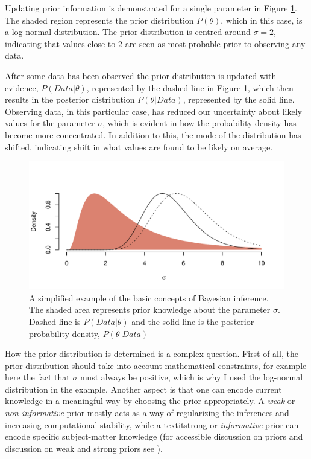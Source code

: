 \documentclass{article}\usepackage{knitr}
\begin{document}
Updating prior information is demonstrated for a single parameter in Figure \ref{fig:priorpost}. The shaded region represents the prior distribution $P(\theta)$, which in this case, is a log-normal distribution. The prior distribution is centred around $\sigma = 2$, indicating that values close to $2$ are seen as most probable prior to observing any data. 

After some data has been observed the prior distribution is updated with evidence, $P(Data | \theta)$, represented by the dashed line in Figure \ref{fig:priorpost}, which then results in the posterior distribution $P(\theta | Data)$, represented by the solid line. Observing data, in this particular case, has reduced our uncertainty about likely values for the parameter $\sigma$, which is evident in how the probability density has become more concentrated. In addition to this, the mode of the distribution has shifted, indicating shift in what values are found to be likely on average.

\begin{figure}
\centering
\begin{knitrout}
\color{fgcolor}
\includegraphics[width=\maxwidth]{figure/unnamed-chunk-13-1} 
\end{knitrout}
\caption{A simplified example of the basic concepts of Bayesian inference. The shaded area represents prior knowledge about the parameter $\sigma$. Dashed line is $P(Data | \theta)$ and the solid line is the posterior probability density, $P(\theta | Data)$}
\label{fig:priorpost}
\end{figure}

How the prior distribution is determined is a complex question. First of all, the prior distribution should take into account mathematical constraints, for example here the fact that $\sigma$ must always be positive, which is why I used the log-normal distribution in the example. Another aspect is that one can encode current knowledge in a meaningful way by choosing the prior appropriately. A \textit{weak} or \textit{non-informative} prior mostly acts as a way of regularizing the inferences and increasing computational stability, while a textit{strong} or \textit{informative} prior can encode specific subject-matter knowledge (for accessible discussion on priors and discussion on weak and strong priors see \citet{prior_choice_recommendations}). 
\end{document}
